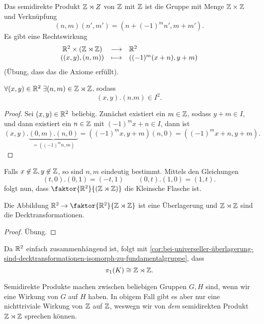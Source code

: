 \begin{nexample}\label{ex:fundamentalgruppe-der-kleinschen-flasche-mittels-semidirektem-produkt-z-z}
    Das semidirekte Produkt $\mathbb{Z} \rtimes Z$ von $\mathbb{Z}$ mit $\mathbb{Z}$ ist die Gruppe mit Menge $\mathbb{Z}\times \mathbb{Z}$ und Verknüpfung
    \[
        (n,m)(n',m') = (n+(-1)^m n', m + m')
    .\] 
    Es gibt eine Rechtswirkung
        \begin{equation*}
        \begin{array}{c c l} 
            \mathbb{R}^2\times (\mathbb{Z}\rtimes \mathbb{Z}) & \longrightarrow & \mathbb{R}^2 \\
            ((x,y),(n,m)) & \longmapsto &  ((-1)^m(x+n),y+m)
        \end{array}
    \end{equation*}
    (Übung, dass das die Axiome erfüllt).
    \begin{claim*}
        $\forall (x,y) \in \mathbb{R}^2 \; \exists (n,m) \in \mathbb{Z}\rtimes \mathbb{Z}$, sodass
        \[
            (x,y).(n.m) \in I^2
        .\] 
    \end{claim*}
    \begin{proof}
        Sei $(x,y) \in \mathbb{R}^2$ beliebig. Zunächst existiert ein $m\in \mathbb{Z}$, sodass $y + m \in I$, und dann existiert ein $n\in \mathbb{Z}$ mit $(-1)^m x + n\in I$, dann ist
        \[
            (x,y) . \underbrace{(0,m).(n,0)}_{=((-1)^mn, m)} = ((-1)^mx, y+m)(n,0) = ((-1)^mx + n, y+m)
        .\] 
    \end{proof}
        Falls $x\not\in \mathbb{Z}, y\not\in \mathbb{Z}$, so sind $n,m$ eindeutig bestimmt. Mittels den Gleichungen
        \[
            (t,0).(0,1) = (-t,1) \qquad (0,t).(1,0) = (1,t)
        .\] 
        folgt nun, dass $\faktor{\R^2}{(\Z \rtimes \Z)}$ die Kleinsche Flasche ist.
        \begin{claim*}
            Die Abbildung $\R^2 \to  \faktor{\R^2}{\Z \rtimes \Z}$ ist eine Überlagerung und $\mathbb{Z} \rtimes \mathbb{Z}$ sind die Decktransformationen.
        \end{claim*}
        \begin{proof}
            Übung.
        \end{proof}
        Da $\mathbb{R}^2$ einfach zusammenhängend ist, folgt mit \autoref{cor:bei-universeller-überlagerung-sind-decktransformationen-isomorph-zu-fundamentalgruppe}, dass
        \[
            \pi_1(K) \cong \mathbb{Z} \rtimes \mathbb{Z}
        .\] 
\end{nexample}

\begin{oral}
    Semidirekte Produkte machen zwischen beliebigen Gruppen $G, H$ sind, wenn wir eine Wirkung von $G$ auf  $H$ haben. In obigem Fall gibt es aber nur eine nichttriviale Wirkung von  $\mathbb{Z}$ auf $\mathbb{Z}$, weswegn wir von \textit{dem} semidirekten Produkt $\mathbb{Z} \rtimes \mathbb{Z}$ sprechen können. 
\end{oral}
